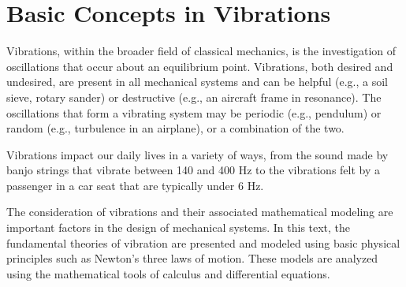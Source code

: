 \documentclass[12pt,letter]{article}
\begin{document}
	
	\setcounter{section}{0}	
	\setcounter{figure}{0}   
	\renewcommand\thefigure{\thesection.\arabic{figure}}
	\setcounter{equation}{0}   
	\renewcommand\theequation{\thesection.\arabic{equation}}

 \section{Basic Concepts in Vibrations}

    Vibrations, within the broader field of classical mechanics, is the investigation of oscillations that occur about an equilibrium point. Vibrations, both desired and undesired, are present in all mechanical systems and can be helpful (e.g., a soil sieve, rotary sander) or destructive (e.g., an aircraft frame in resonance). The oscillations that form a vibrating system may be periodic (e.g., pendulum) or random (e.g., turbulence in an airplane), or a combination of the two. 

    Vibrations impact our daily lives in a variety of ways, from the sound made by banjo strings that vibrate between 140 and 400 Hz to the vibrations felt by a passenger in a car seat that are typically under 6 Hz.
    
    The consideration of vibrations and their associated mathematical modeling are important factors in the design of mechanical systems. In this text, the fundamental theories of vibration are presented and modeled using basic physical principles such as Newton's three laws of motion. These models are analyzed using the mathematical tools of calculus and differential equations. 
\end{document}
